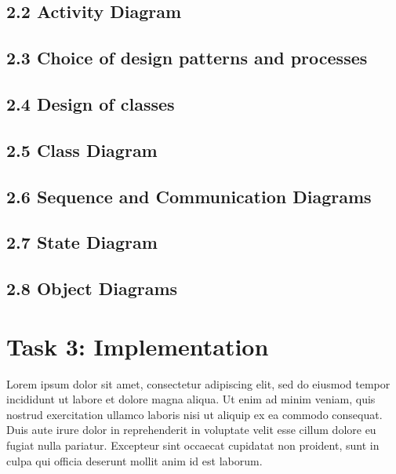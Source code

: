 \documentclass[titlepage]{article}
\begin{document}
\subsection*{2.2 Activity Diagram}

\subsection*{2.3 Choice of design patterns and processes}

\subsection*{2.4 Design of classes}

\subsection*{2.5 Class Diagram}

\subsection*{2.6 Sequence and Communication Diagrams}

\subsection*{2.7 State Diagram}

\subsection*{2.8 Object Diagrams}

\section*{Task 3: Implementation}
Lorem ipsum dolor sit amet, consectetur adipiscing elit, sed do eiusmod tempor incididunt ut labore et dolore magna aliqua. Ut enim ad minim veniam, quis nostrud exercitation ullamco laboris nisi ut aliquip ex ea commodo consequat. Duis aute irure dolor in reprehenderit in voluptate velit esse cillum dolore eu fugiat nulla pariatur. Excepteur sint occaecat cupidatat non proident, sunt in culpa qui officia deserunt mollit anim id est laborum.
\end{document}
